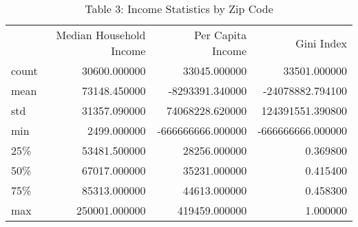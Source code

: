 \documentclass[11pt]{article}
\begin{document}
\begin{table}[H]
    \caption{Table 3: Income Statistics by Zip Code}
    \begin{tabular}{lrrr}
     & Median Household Income & Per Capita Income & Gini Index \\
    count & 30600.000000 & 33045.000000 & 33501.000000 \\
    mean & 73148.450000 & -8293391.340000 & -24078882.794100 \\
    std & 31357.090000 & 74068228.620000 & 124391551.390800 \\
    min & 2499.000000 & -666666666.000000 & -666666666.000000 \\
    25\% & 53481.500000 & 28256.000000 & 0.369800 \\
    50\% & 67017.000000 & 35231.000000 & 0.415400 \\
    75\% & 85313.000000 & 44613.000000 & 0.458300 \\
    max & 250001.000000 & 419459.000000 & 1.000000 \\
    \end{tabular}
\end{table}
\end{document}

